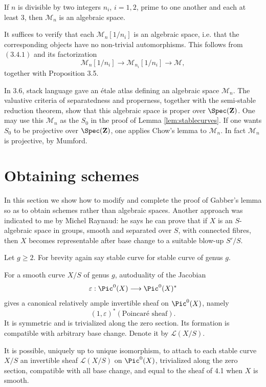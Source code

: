 \begin{corollary}
If $n$ is divisible by two integers $n_i$, $i=1,2$, prime to one another and each at least $3$, then $\mathcal M_n$ is an algebraic space.
\end{corollary}

It suffices to verify that each $\mathcal M_n[1/n_i]$ is an algebraic space, i.e. that the corresponding objects have no non-trivial automorphisms. This follows from \((3.4.1)\) and its factorization
\[
  \mathcal M_n[1/n_i]\longrightarrow \mathcal M_{n_i}[1/n_i]\longrightarrow \mathcal M,
\]
together with Proposition 3.5.

In 3.6, stack language gave an étale atlas defining an algebraic space $\mathcal M_n$. The valuative criteria of separatedness and properness, together with the semi-stable reduction theorem, show that this algebraic space is proper over $\Spec(\mathbf Z)$. One may use this $\mathcal M_n$ as the $S_0$ in the proof of Lemma \ref{lem:stablecurves}. If one wants $S_0$ to be projective over $\Spec(\mathbf Z)$, one applies Chow's lemma to $\mathcal M_n$. In fact $\mathcal M_n$ is projective, by Mumford.

\section{Obtaining schemes}

In this section we show how to modify and complete the proof of Gabber's lemma so as to obtain schemes rather than algebraic spaces. Another approach was indicated to me by Michel Raynaud: he says he can prove that if $X$ is an $S$-algebraic space in groups, smooth and separated over $S$, with connected fibres, then $X$ becomes representable after base change to a suitable blow-up $S'/S$.

Let $g\ge2$. For brevity again say stable curve for stable curve of genus $g$.

For a smooth curve $X/S$ of genus $g$, autoduality of the Jacobian
\[
  \varepsilon:\Pic^0(X)\longrightarrow \Pic^0(X)^*
\]
gives a canonical relatively ample invertible sheaf on $\Pic^0(X)$, namely
\[
  (1,\varepsilon)^*(\text{Poincaré sheaf}).
\]
It is symmetric and is trivialized along the zero section. Its formation is compatible with arbitrary base change. Denote it by $\mathcal L(X/S)$.

\begin{lemma}
It is possible, uniquely up to unique isomorphism, to attach to each stable curve $X/S$ an invertible sheaf $\mathcal L(X/S)$ on $\Pic^0(X)$, trivialized along the zero section, compatible with all base change, and equal to the sheaf of 4.1 when $X$ is smooth.
\end{lemma}

